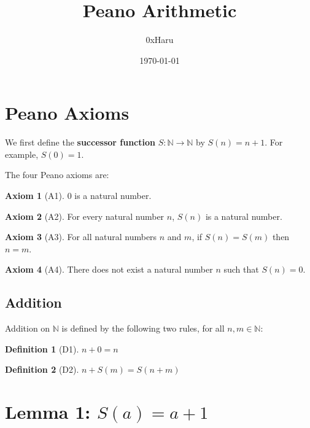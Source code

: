 \documentclass[12pt, a4paper]{article}
\title{\textbf{Peano Arithmetic}}
\author{0xHaru}
\date{\today}
\theoremstyle{plain}
\theoremstyle{definition}
\newtheorem{axiomentry}{Axiom}
\newtheorem{defentry}{Definition}
\begin{document}
\maketitle

\section*{Peano Axioms}

We first define the \textbf{successor function} $S : \mathbb{N} \to \mathbb{N}$
by $S(n) = n + 1$. For example, $S(0) = 1$.

The four Peano axioms are:

\begin{axiomentry}[A1]
$0$ is a natural number.
\end{axiomentry}

\begin{axiomentry}[A2]
For every natural number $n$, $S(n)$ is a natural number.
\end{axiomentry}

\begin{axiomentry}[A3]
For all natural numbers $n$ and $m$, if $S(n) = S(m)$ then $n = m$.
\end{axiomentry}

\begin{axiomentry}[A4]
There does not exist a natural number $n$ such that $S(n) = 0$.
\end{axiomentry}

\subsection*{Addition}

Addition on $\mathbb{N}$ is defined by the following two rules,
for all $n, m \in \mathbb{N}$:

\begin{defentry}[D1]
$n + 0 = n$
\end{defentry}

\begin{defentry}[D2]
$n + S(m) = S(n + m)$
\end{defentry}

\section*{Lemma 1: $S(a) = a + 1$}
\end{document}
